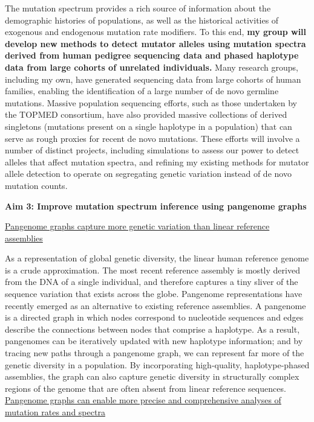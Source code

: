 \documentclass[11pt,a4paper,sans]{moderncv}
\begin{document}
The mutation spectrum provides a rich source of information about the demographic 
histories of populations, as well as the historical activities of exogenous and 
endogenous mutation rate modifiers. To this end, \textbf{my group will develop new methods
to detect mutator alleles using mutation spectra derived from human pedigree 
sequencing data and phased haplotype data from large cohorts of unrelated 
individuals.} Many research groups, including my own, have generated sequencing 
data from large cohorts of human families, enabling the identification of a 
large number of de novo germline mutations. Massive population sequencing efforts,
such as those undertaken by the TOPMED consortium, have also provided massive 
collections of derived singletons (mutations present on a single haplotype in 
a population) that can serve as rough proxies for recent de novo mutations. 
These efforts will involve a number of distinct projects, including simulations
to assess our power to detect alleles that affect mutation spectra, and 
refining my existing methods for mutator allele detection to operate on 
segregating genetic variation instead of de novo mutation counts.
\break 

\textbf{Aim 3: Improve mutation spectrum inference using pangenome graphs}

\underline{Pangenome graphs capture more genetic variation than linear reference assemblies}


As a representation of global genetic diversity, the linear human reference genome 
is a crude approximation. The most recent reference assembly is mostly derived from
the DNA of a single individual, and therefore captures a tiny sliver of the 
sequence variation that exists across the globe. Pangenome representations have 
recently emerged as an alternative to existing reference assemblies. A pangenome 
is a directed graph in which nodes correspond to nucleotide sequences and edges 
describe the connections between nodes that comprise a haplotype. As a result, 
pangenomes can be iteratively updated with new haplotype information; and by 
tracing new paths through a pangenome graph, we can represent far more of the 
genetic diversity in a population. By incorporating high-quality, haplotype-phased 
assemblies, the graph can also capture genetic diversity in 
structurally complex regions of the genome that are often absent from linear 
reference sequences. 
\break \break
\underline{Pangenome graphs can enable more precise and comprehensive analyses of mutation rates and spectra}
\end{document}
